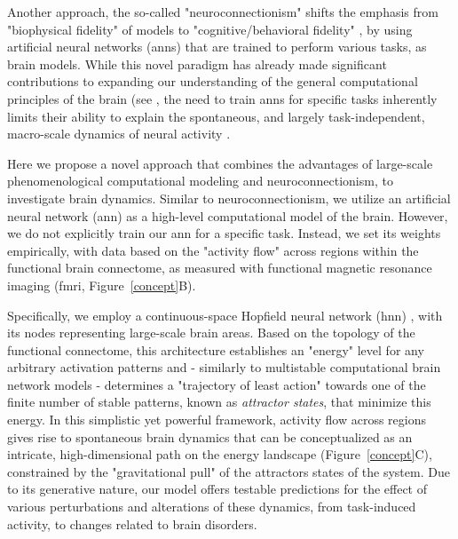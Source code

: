 \documentclass{article}
\begin{document}
Another approach, the so-called "neuroconnectionism" \citep{doerig2023neuroconnectionist} shifts the emphasis from "biophysical fidelity" of models to "cognitive/behavioral fidelity" \citep{kriegeskorte2018cognitive}, by using artificial neural networks (\acrshort{ann}s) that are trained to perform various tasks, as brain models. While this novel paradigm has already made significant contributions to expanding our understanding of the general computational principles of the brain (see \cite{doerig2023neuroconnectionist}, the need to train \acrshort{ann}s for specific tasks inherently limits their ability to explain the spontaneous, and largely task-independent, macro-scale dynamics of neural activity \citep{richards2019deep}.

Here we propose a novel approach that combines the advantages of large-scale phenomenological computational modeling and neuroconnectionism, to investigate brain dynamics.
Similar to neuroconnectionism, we utilize an artificial neural network (\acrshort{ann}) as a high-level computational model of the brain.
However, we do not explicitly train our \acrshort{ann} for a specific task. Instead, we set its weights empirically, with data based on the "activity flow" \citep{cole2016activity, ito2017cognitive} across regions within the functional brain connectome, as measured with functional magnetic resonance imaging (\acrshort{fmri}, Figure~\ref{concept}B).

Specifically, we employ a continuous-space Hopfield neural network (\acrshort{hnn}) \citep{hopfield1982neural, krotov2023new}, with its nodes representing large-scale brain areas. Based on the topology of the functional connectome, this architecture establishes an "energy" level for any arbitrary activation patterns and - similarly to multistable computational brain network models \citep{schirner2022dynamic} - determines a "trajectory of least action" towards one of the finite number of stable patterns, known as \textit{attractor states}, that minimize this energy.
In this simplistic yet powerful framework, activity flow \citep{cole2016activity} across regions gives rise to spontaneous brain dynamics that can be conceptualized as an intricate, high-dimensional path on the energy landscape (Figure~\ref{concept}C), constrained by the "gravitational pull" of the attractors states of the system.
Due to its generative nature, our model offers testable predictions for the effect of various perturbations and alterations of these dynamics, from task-induced activity, to changes related to brain disorders.
\end{document}
